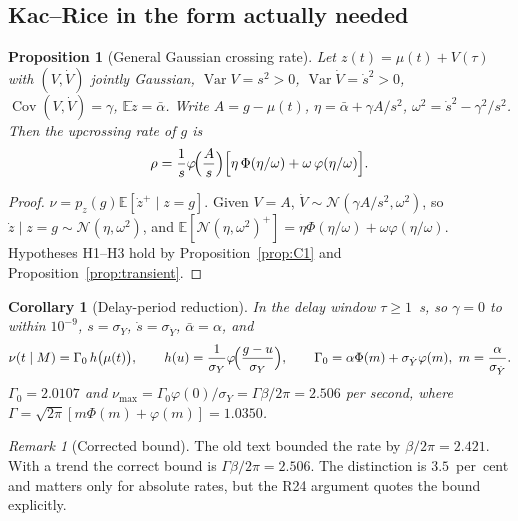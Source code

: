 \documentclass[11pt,a4paper]{article}
\newcommand{\E}{\mathbb{E}}
\newcommand{\Var}{\operatorname{Var}}
\newcommand{\Cov}{\operatorname{Cov}}
\newcommand{\Mrv}{M}
\theoremstyle{plain}
\newtheorem{proposition}{Proposition}
\newtheorem{corollary}{Corollary}
\theoremstyle{remark}
\newtheorem{remark}{Remark}
\begin{document}
\subsection{Kac--Rice in the form actually needed}
\label{sec:rice}

\begin{proposition}[General Gaussian crossing rate]
\label{prop:rice-gen}
Let $z(t)=\mu(t)+V(\tau)$ with $(V,\dot V)$ jointly Gaussian, $\Var V=s^2>0$,
$\Var\dot V=\dot s^2>0$, $\Cov(V,\dot V)=\gamma$, $\E\dot z=\bar\alpha$. Write
$A=g-\mu(t)$, $\eta=\bar\alpha+\gamma A/s^2$, $\omega^2=\dot s^2-\gamma^2/s^2$. Then the
upcrossing rate of $g$ is
\begin{equation}
\rho=\frac{1}{s}\varphi\!\Bigl(\frac{A}{s}\Bigr)
\Bigl[\eta\,\Phi(\eta/\omega)+\omega\,\varphi(\eta/\omega)\Bigr].
\label{eq:rice-gen}
\end{equation}
\end{proposition}

\begin{proof}
$\nu=p_{z}(g)\E[\dot z^{+}\mid z=g]$. Given $V=A$, $\dot V\sim\mathcal N(\gamma A/s^2,\omega^2)$,
so $\dot z\mid z=g\sim\mathcal N(\eta,\omega^2)$, and
$\E[\mathcal N(\eta,\omega^2)^{+}]=\eta\Phi(\eta/\omega)+\omega\varphi(\eta/\omega)$.
Hypotheses H1--H3 hold by Proposition~\ref{prop:C1} and Proposition~\ref{prop:transient}.
\end{proof}

\begin{corollary}[Delay-period reduction]
\label{cor:rice-delay}
In the delay window $\tau\ge1$~s, so $\gamma=0$ to within $10^{-9}$, $s=\sigma_Y$,
$\dot s=\sigma_{\dot Y}$, $\bar\alpha=\alpha$, and
\begin{equation}
\nu(t\mid \Mrv)=\Gamma_0\,h\bigl(\mu(t)\bigr),\qquad
h(u)=\frac{1}{\sigma_Y}\varphi\!\Bigl(\frac{g-u}{\sigma_Y}\Bigr),\qquad
\Gamma_0=\alpha\Phi(m)+\sigma_{\dot Y}\varphi(m),\ m=\frac{\alpha}{\sigma_{\dot Y}} .
\label{eq:nucond}
\end{equation}
$\Gamma_0=2.0107$ and $\nu_{\max}=\Gamma_0\varphi(0)/\sigma_Y=\Gamma\beta/2\pi=2.506$ per
second, where $\Gamma=\sqrt{2\pi}[m\Phi(m)+\varphi(m)]=1.0350$.
\end{corollary}

\begin{remark}[Corrected bound]
The old text bounded the rate by $\beta/2\pi=2.421$. With a trend the correct bound is
$\Gamma\beta/2\pi=2.506$. The distinction is $3.5$~per~cent and matters only for absolute
rates, but the R24 argument quotes the bound explicitly.
\end{remark}
\end{document}
